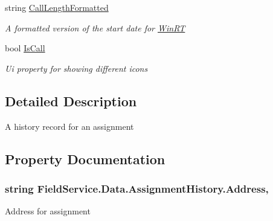 \begin{DoxyCompactItemize}
string \hyperlink{class_field_service_1_1_data_1_1_assignment_history_addfdb67fdeb889866e1d3ad658ffda0e}{Call\+Length\+Formatted}
\begin{DoxyCompactList}\small\item\em A formatted version of the start date for \hyperlink{namespace_field_service_1_1_win_r_t}{Win\+R\+T} \end{DoxyCompactList}\item 
bool \hyperlink{class_field_service_1_1_data_1_1_assignment_history_a2475740ab558970e304fe82f78a822d5}{Is\+Call}
\begin{DoxyCompactList}\small\item\em Ui property for showing different icons \end{DoxyCompactList}\end{DoxyCompactItemize}


\subsection{Detailed Description}
A history record for an assignment 



\subsection{Property Documentation}
\hypertarget{class_field_service_1_1_data_1_1_assignment_history_a5720ed97ec12bfcc619225b25e559074}{
\subsubsection[{Address}]{\setlength{\rightskip}{0pt plus 5cm}string Field\+Service.\+Data.\+Assignment\+History.\+Address\hspace{0.3cm}{\ttfamily [get]}, {\ttfamily [set]}}}\label{class_field_service_1_1_data_1_1_assignment_history_a5720ed97ec12bfcc619225b25e559074}


Address for assignment 

